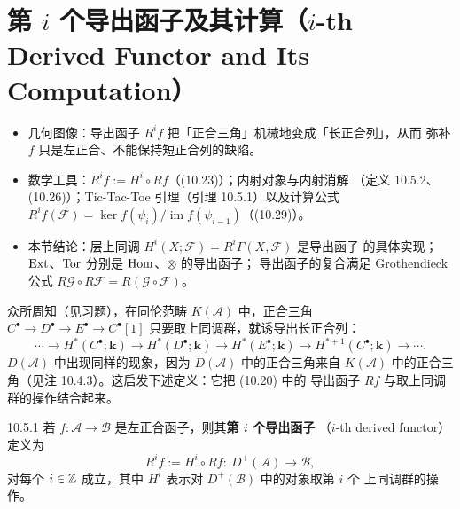\section{第 $i$ 个导出函子及其计算（$i$-th Derived Functor and Its Computation）}

\begin{keytakeaways}
\begin{itemize}
  \item 几何图像：导出函子 $R^i f$ 把「正合三角」机械地变成「长正合列」，从而
        弥补 $f$ 只是左正合、不能保持短正合列的缺陷。
  \item 数学工具：$R^if:=H^i\circ Rf$（(10.23)）；内射对象与内射消解
        （定义 10.5.2、(10.26)）；Tic-Tac-Toe 引理（引理 10.5.1）以及计算公式
        $R^if(\mathcal F)=\ker f(\psi_i)/\operatorname{im}f(\psi_{i-1})$（(10.29)）。
  \item 本节结论：层上同调 $H^i(X;\mathcal F)=R^i\Gamma(X,\mathcal F)$ 是导出函子
        的具体实现；$\operatorname{Ext}$、$\operatorname{Tor}$ 分别是 $\operatorname{Hom}$、$\otimes$ 的导出函子；
        导出函子的复合满足 Grothendieck 公式 $R\mathcal G\circ R\mathcal F
        =R(\mathcal G\circ\mathcal F)$。
\end{itemize}
\end{keytakeaways}

众所周知（见习题），在同伦范畴 $K(\mathcal A)$ 中，正合三角
$C^{\bullet}\to D^{\bullet}\to E^{\bullet}\to C^{\bullet}[1]$
只要取上同调群，就诱导出长正合列：
\begin{equation}\tag{10.22}
  \cdots\to H^{*}(C^{\bullet};\mathbf{k})
  \to H^{*}(D^{\bullet};\mathbf{k})
  \to H^{*}(E^{\bullet};\mathbf{k})
  \to H^{*+1}(C^{\bullet};\mathbf{k})\to\cdots .
\end{equation}
$D(\mathcal A)$ 中出现同样的现象，因为 $D(\mathcal A)$ 中的正合三角来自
$K(\mathcal A)$ 中的正合三角（见注 10.4.3）。这启发下述定义：它把 (10.20) 中的
导出函子 $Rf$ 与取上同调群的操作结合起来。

\begin{wdefn}{10.5.1}
若 $f:\mathcal A\to\mathcal B$ 是左正合函子，则其\textbf{第 $i$ 个导出函子}
（$i$-th derived functor）定义为
\begin{equation}\tag{10.23}
  R^if:=H^i\circ Rf:\ D^+(\mathcal A)\to\mathcal B,
\end{equation}
对每个 $i\in\mathbb{Z}$ 成立，其中 $H^i$ 表示对 $D^+(\mathcal B)$ 中的对象取第 $i$ 个
上同调群的操作。
\end{wdefn}



